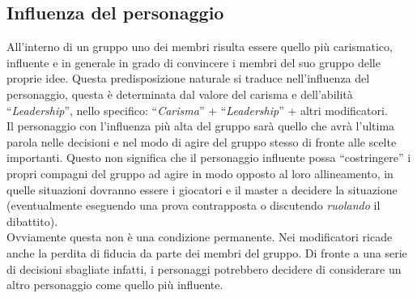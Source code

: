 \documentclass[../manuale_main.tex]{subfiles}
\begin{document}
\subsection{Influenza del personaggio}
All’interno di un gruppo uno dei membri risulta essere quello più carismatico, influente e in generale in grado di convincere i membri del suo gruppo delle proprie idee.
Questa predisposizione naturale si traduce nell’influenza del personaggio, questa è determinata dal valore del carisma e dell’abilità ``\emph{Leadership}'', nello specifico: ``\emph{Carisma}'' + ``\emph{Leadership}'' + altri modificatori.\\
Il personaggio con l’influenza più alta del gruppo sarà quello che avrà l’ultima parola nelle decisioni e nel modo di agire del gruppo stesso di fronte alle scelte importanti.
Questo non significa che il personaggio influente possa ``costringere'' i propri compagni del gruppo ad agire in modo opposto al loro allineamento, in quelle situazioni dovranno essere i giocatori e il master a decidere la situazione (eventualmente eseguendo una prova contrapposta o discutendo \emph{ruolando}  il dibattito).\\
Ovviamente questa non è una condizione permanente. Nei modificatori ricade anche la perdita di fiducia da parte dei membri del gruppo. Di fronte a una serie di decisioni sbagliate infatti, i personaggi potrebbero decidere di considerare un altro personaggio come quello più influente.
\end{document}
